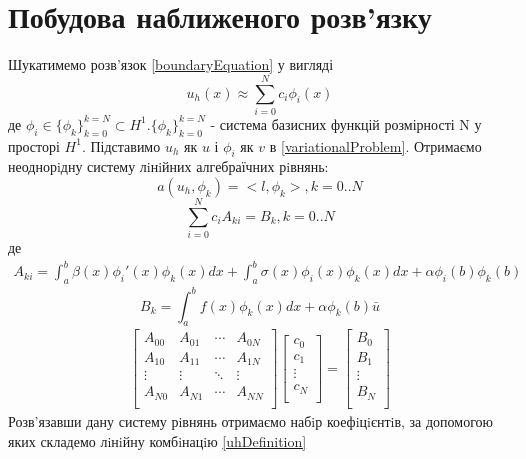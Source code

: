 \documentclass[a4paper]{article}
\numberwithin{equation}{section}
\begin{document}
\section{Побудова наближеного розв’язку}
Шукатимемо розв’язок \ref{boundaryEquation} у вигляді 
\begin{equation}\label{uhDefinition}
u_h(x)\approx\sum_{i=0}^{N} c_i\phi_i(x)
\end{equation}
де $\phi_i\in\{\phi_k\}_{k=0}^{k=N} \subset H^1. \{\phi_k\}_{k=0}^{k=N}$ - система базисних функцій розмірності N у просторі $H^1$. Підставимо $u_h$ як $u$ і $\phi_i$ як $v$ в \ref{variationalProblem}.
Отримаємо неоднорiдну систему лiнiйних алгебраїчних рiвнянь:
\begin{equation}
a(u_h, \phi_k)=<l,\phi_k>,  k=0..N
\end{equation}
\begin{equation}\label{matrixEquation}
\sum_{i=0}^{N} c_iA_{ki} = B_k,  k=0..N
\end{equation}
де
\begin{equation}\label{AkiLast}
\begin{split}
A_{ki}= \int_a^b \beta(x) \phi_i'(x) \phi_k(x) dx+
\int_a^b \sigma(x) \phi_i(x) \phi_k(x) dx + \alpha \phi_i(b) \phi_k(b)  
\end{split}
\end{equation}
\begin{equation}\label{BkLast}
B_k=\int_a^bf(x)\phi_k(x)dx + \alpha \phi_k(b) \bar{u}
\end{equation}
\begin{eqnarray}\label{equationsSystem}
\begin{bmatrix}
A_{00} & A_{01} & \cdots & A_{0N} \\
A_{10} & A_{11} & \cdots & A_{1N} \\
\vdots & \vdots & \ddots & \vdots \\
A_{N0} & A_{N1} & \cdots & A_{NN} \\
\end{bmatrix}
\begin{bmatrix}
c_0 \\
c_1 \\
\vdots \\
c_N \\
\end{bmatrix}
=
\begin{bmatrix}
B_0 \\
B_1 \\
\vdots \\
B_N \\
\end{bmatrix}
\end{eqnarray}
Розв’язавши дану систему рiвнянь отримаємо набiр коефiцiєнтiв, за допомогою яких складемо лiнiйну комбiнацiю \ref{uhDefinition}
\end{document}
